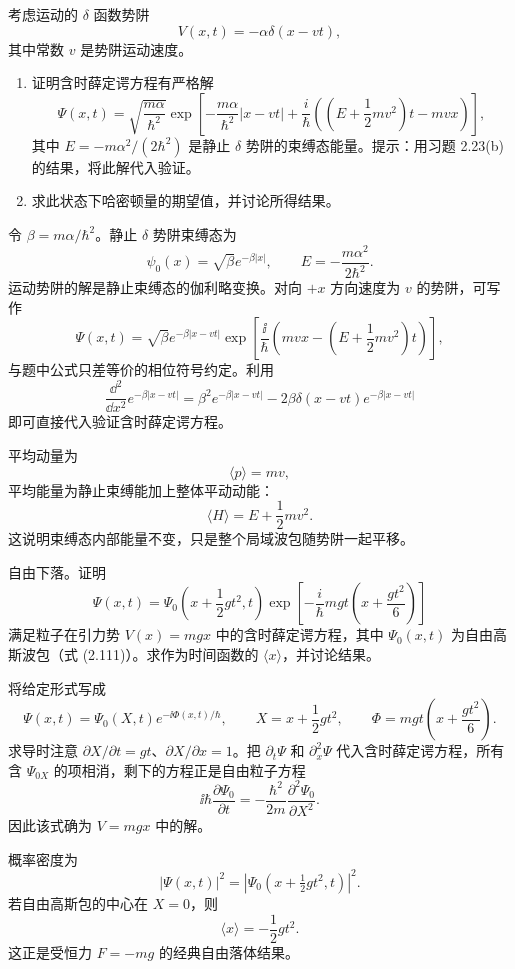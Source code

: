 \begin{question}
考虑运动的 $\delta$ 函数势阱
\[
V(x,t)=-\alpha\delta(x-vt),
\]
其中常数 $v$ 是势阱运动速度。
\begin{enumerate}
\item 证明含时薛定谔方程有严格解
\[
\Psi(x,t)=\sqrt{\frac{m\alpha}{\hbar^2}}
\exp\!\left[-\frac{m\alpha}{\hbar^2}|x-vt|+\frac{i}{\hbar}\left((E+\frac12mv^2)t-mvx\right)\right],
\]
其中 $E=-m\alpha^2/(2\hbar^2)$ 是静止 $\delta$ 势阱的束缚态能量。提示：用习题 2.23(b) 的结果，将此解代入验证。
\item 求此状态下哈密顿量的期望值，并讨论所得结果。
\end{enumerate}
\end{question}
\begin{solution}
令 $\beta=m\alpha/\hbar^2$。静止 $\delta$ 势阱束缚态为
\[
\psi_0(x)=\sqrt\beta e^{-\beta|x|},
\qquad
E=-\frac{m\alpha^2}{2\hbar^2}.
\]
运动势阱的解是静止束缚态的伽利略变换。对向 $+x$ 方向速度为 $v$ 的势阱，可写作
\[
\Psi(x,t)=\sqrt\beta e^{-\beta|x-vt|}
\exp\left[\frac{\ii}{\hbar}\left(mvx-\left(E+\frac12mv^2\right)t\right)\right],
\]
与题中公式只差等价的相位符号约定。利用
\[
\frac{\dd^2}{\dd x^2}e^{-\beta|x-vt|}
=\beta^2e^{-\beta|x-vt|}-2\beta\delta(x-vt)e^{-\beta|x-vt|}
\]
即可直接代入验证含时薛定谔方程。

平均动量为
\[
\langle p\rangle=mv,
\]
平均能量为静止束缚能加上整体平动动能：
\[
\langle H\rangle=E+\frac12mv^2.
\]
这说明束缚态内部能量不变，只是整个局域波包随势阱一起平移。
\end{solution}

\begin{question}
自由下落。证明
\[
\Psi(x,t)=\Psi_0\left(x+\frac12gt^2,t\right)
\exp\left[-\frac{i}{\hbar}mgt\left(x+\frac{g t^2}{6}\right)\right]
\]
满足粒子在引力势 $V(x)=mgx$ 中的含时薛定谔方程，其中 $\Psi_0(x,t)$ 为自由高斯波包（式 (2.111)）。求作为时间函数的 $\langle x\rangle$，并讨论结果。

\par\smallskip
{}

\end{question}
\begin{solution}
将给定形式写成
\[
\Psi(x,t)=\Psi_0(X,t)e^{-\ii\Phi(x,t)/\hbar},
\qquad
X=x+\frac12gt^2,
\qquad
\Phi=mgt\left(x+\frac{gt^2}{6}\right).
\]
求导时注意 $\partial X/\partial t=gt$、$\partial X/\partial x=1$。把 $\partial_t\Psi$ 和 $\partial_x^2\Psi$ 代入含时薛定谔方程，所有含 $\Psi_{0X}$ 的项相消，剩下的方程正是自由粒子方程
\[
\ii\hbar\frac{\partial\Psi_0}{\partial t}
=-\frac{\hbar^2}{2m}\frac{\partial^2\Psi_0}{\partial X^2}.
\]
因此该式确为 $V=mgx$ 中的解。

概率密度为
\[
|\Psi(x,t)|^2=|\Psi_0(x+\tfrac12gt^2,t)|^2.
\]
若自由高斯包的中心在 $X=0$，则
\[
\langle x\rangle=-\frac12gt^2.
\]
这正是受恒力 $F=-mg$ 的经典自由落体结果。
\end{solution}

